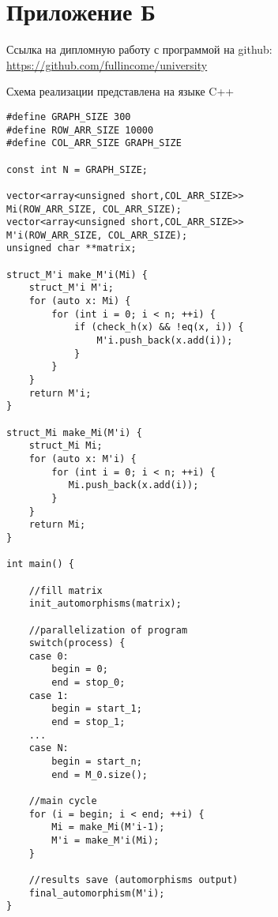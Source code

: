 \section*{Приложение Б}
\label{sec:Appendix_2} 
\large 

Ссылка на дипломную работу с программой на github:\\
\href{https://github.com/fullincome/university}{https://github.com/fullincome/university}

Схема реализации представлена на языке C++

\begin{lstlisting}
#define GRAPH_SIZE 300
#define ROW_ARR_SIZE 10000 
#define COL_ARR_SIZE GRAPH_SIZE

const int N = GRAPH_SIZE;

vector<array<unsigned short,COL_ARR_SIZE>> 
Mi(ROW_ARR_SIZE, COL_ARR_SIZE);
vector<array<unsigned short,COL_ARR_SIZE>> 
M'i(ROW_ARR_SIZE, COL_ARR_SIZE);
unsigned char **matrix;

struct_M'i make_M'i(Mi) {
    struct_M'i M'i;
    for (auto x: Mi) {
        for (int i = 0; i < n; ++i) {
            if (check_h(x) && !eq(x, i)) {
                M'i.push_back(x.add(i));
            }
        }
    }
    return M'i;
}

struct_Mi make_Mi(M'i) {
    struct_Mi Mi;
    for (auto x: M'i) {
        for (int i = 0; i < n; ++i) {
           Mi.push_back(x.add(i));
        }
    }
    return Mi;
}

int main() {

    //fill matrix
    init_automorphisms(matrix);

    //parallelization of program
    switch(process) {
    case 0:
        begin = 0;
        end = stop_0;
    case 1:
        begin = start_1;
        end = stop_1;
    ...
    case N:
        begin = start_n;
        end = M_0.size();

    //main cycle
    for (i = begin; i < end; ++i) {
        Mi = make_Mi(M'i-1);
        M'i = make_M'i(Mi);
    }

    //results save (automorphisms output)
    final_automorphism(M'i);
}
\end{lstlisting}
